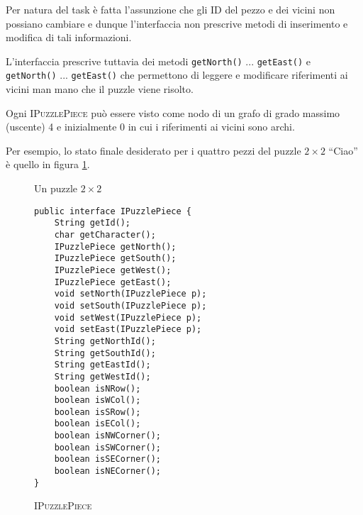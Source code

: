 \documentclass[a4paper]{article}
\newcommand{\Ifacename}[1]{\textsc{#1}}
\newcommand{\Methodname}[1]{\texttt{#1}}
\begin{document}
Per natura del task \`e fatta l'assunzione che gli ID del pezzo e dei vicini non possiano cambiare e dunque l'interfaccia non prescrive metodi di inserimento e modifica di tali informazioni.

L'interfaccia prescrive tuttavia dei metodi \Methodname{getNorth()} ... \Methodname{getEast()}  e  \Methodname{getNorth()} ... \Methodname{getEast()} che permettono di leggere e modificare riferimenti ai vicini man mano che il puzzle viene risolto.

Ogni \Ifacename{IPuzzlePiece} pu\`o essere visto come nodo di un grafo di grado massimo (uscente) 4 e inizialmente 0 in cui i riferimenti ai vicini sono archi.

Per esempio, lo stato finale desiderato per i quattro pezzi del puzzle $2\times2$ ``Ciao'' \`e quello in figura \ref{fig:ciao}.

\begin{figure}[h!]
  \centering
{}
\caption {Un puzzle $2\times2$}
\label{fig:ciao}
\end{figure}

\begin{figure}[h]
  \centering
\begin{lstlisting}[frame=single]
public interface IPuzzlePiece {
	String getId();
	char getCharacter();
	IPuzzlePiece getNorth();
	IPuzzlePiece getSouth();
	IPuzzlePiece getWest();
	IPuzzlePiece getEast();
	void setNorth(IPuzzlePiece p);
	void setSouth(IPuzzlePiece p);
	void setWest(IPuzzlePiece p);
	void setEast(IPuzzlePiece p);
	String getNorthId();
	String getSouthId();
	String getEastId();
	String getWestId();
	boolean isNRow();
	boolean isWCol();
	boolean isSRow();
	boolean isECol();
	boolean isNWCorner();
	boolean isSWCorner();
	boolean isSECorner();
	boolean isNECorner();
}
\end{lstlisting}
\caption {\textsc{IPuzzlePiece}}
\end{figure}
\end{document}
